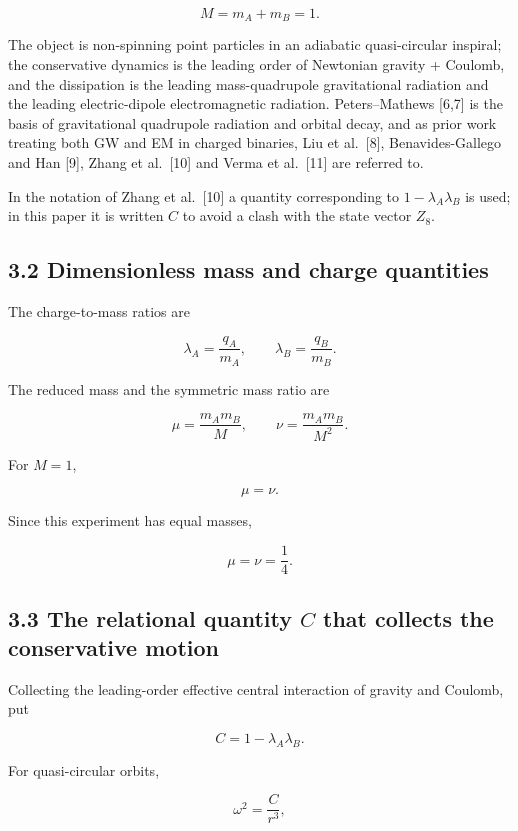 \documentclass[
  a4paper,
]{article}
\begin{document}
\[
M=m_A+m_B=1.
\]

The object is non-spinning point particles in an adiabatic
quasi-circular inspiral; the conservative dynamics is the leading order
of Newtonian gravity + Coulomb, and the dissipation is the leading
mass-quadrupole gravitational radiation and the leading electric-dipole
electromagnetic radiation. Peters--Mathews {[}6,7{]} is the basis of
gravitational quadrupole radiation and orbital decay, and as prior work
treating both GW and EM in charged binaries, Liu et al.~{[}8{]},
Benavides-Gallego and Han {[}9{]}, Zhang et al.~{[}10{]} and Verma et
al.~{[}11{]} are referred to.

In the notation of Zhang et al.~{[}10{]} a quantity corresponding to
\(1-\lambda_A\lambda_B\) is used; in this paper it is written \(C\) to
avoid a clash with the state vector \(Z_8\).

\subsection{3.2 Dimensionless mass and charge
quantities}\label{dimensionless-mass-and-charge-quantities}

The charge-to-mass ratios are

\[
\lambda_A=\frac{q_A}{m_A},
\qquad
\lambda_B=\frac{q_B}{m_B}.
\]

The reduced mass and the symmetric mass ratio are

\[
\mu=\frac{m_A m_B}{M},
\qquad
\nu=\frac{m_A m_B}{M^2}.
\]

For \(M=1\),

\[
\mu=\nu.
\]

Since this experiment has equal masses,

\[
\mu=\nu=\frac14.
\]

\subsection{\texorpdfstring{3.3 The relational quantity \(C\) that
collects the conservative
motion}{3.3 The relational quantity C that collects the conservative motion}}\label{the-relational-quantity-c-that-collects-the-conservative-motion}

Collecting the leading-order effective central interaction of gravity
and Coulomb, put

\[
\boxed{
C=1-\lambda_A\lambda_B.
}
\]

For quasi-circular orbits,

\[
\boxed{
\omega^2=\frac{C}{r^3},
}
\]
\end{document}
